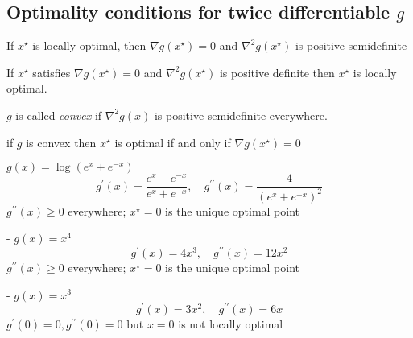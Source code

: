 \subsection{Optimality conditions for twice differentiable $ g $}

\begin{theorem}
    If $ x^{\star} $ is locally optimal, then
$ \nabla g\left(x^{\star}\right)=0 $ and $ \nabla^{2} g\left(x^{\star}\right) $ is positive semidefinite
\end{theorem}

\begin{theorem}
    If $ x^{\star} $ satisfies
$ \nabla g\left(x^{\star}\right)=0 $ and $ \nabla^{2} g\left(x^{\star}\right) $ is positive definite
then $ x^{\star} $ is locally optimal.
\end{theorem}

\begin{definition}
    $ g $ is called \textit{convex} if $ \nabla^{2} g(x) $ is positive semidefinite everywhere.
\end{definition}

\begin{theorem}
    if $ g $ is convex then $ x^{\star} $ is optimal if and only if $ \nabla g\left(x^{\star}\right)=0 $
\end{theorem}




\begin{example}
    $ g(x)=\log \left(e^{x}+e^{-x}\right) $
$$
g^{\prime}(x)=\frac{e^{x}-e^{-x}}{e^{x}+e^{-x}}, \quad g^{\prime \prime}(x)=\frac{4}{\left(e^{x}+e^{-x}\right)^{2}}
$$
$ g^{\prime \prime}(x) \geq 0 $ everywhere; $ x^{\star}=0 $ is the unique optimal point
\end{example}

\begin{example}
    - $ g(x)=x^{4} $
$$
g^{\prime}(x)=4 x^{3}, \quad g^{\prime \prime}(x)=12 x^{2}
$$
$ g^{\prime \prime}(x) \geq 0 $ everywhere; $ x^{\star}=0 $ is the unique optimal point
\end{example}

\begin{example}
    - $ g(x)=x^{3} $
$$
g^{\prime}(x)=3 x^{2}, \quad g^{\prime \prime}(x)=6 x
$$
$ g^{\prime}(0)=0, g^{\prime \prime}(0)=0 $ but $ x=0 $ is not locally optimal
\end{example}

